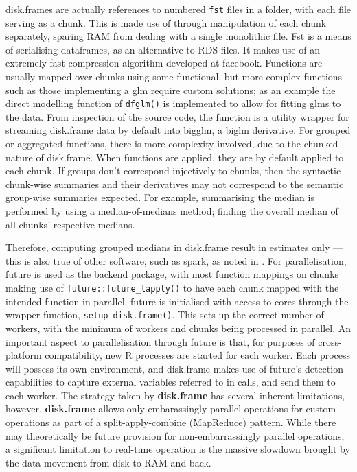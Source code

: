 disk.frames are actually references to numbered \texttt{fst} files in a
folder, with each file serving as a chunk.
This is made use of through manipulation of each chunk separately,
sparing RAM from dealing with a single monolithic
file\cite{zj19:_inges_data}.
Fst is a means of serialising dataframes, as an alternative to RDS
files\cite{klik19}.
It makes use of an extremely fast compression algorithm developed at
facebook.
Functions are usually mapped over chunks using some functional, but more
complex functions such as those implementing a glm require custom
solutions; as an example the direct modelling function of
\texttt{dfglm()} is implemented to allow
for fitting glms to the data.
From inspection of the source code, the function is a utility wrapper
for streaming disk.frame data by default into bigglm, a biglm
derivative.
For grouped or aggregated functions, there is more complexity involved,
due to the chunked nature of disk.frame.
When functions are applied, they are by default applied to each chunk.
If groups don't correspond injectively to chunks, then the syntactic
chunk-wise summaries and their derivatives may not correspond to the
semantic group-wise summaries expected.
For example, summarising the median is performed by using a
median-of-medians method; finding the overall median of all chunks'
respective medians.

Therefore, computing grouped medians in disk.frame result in estimates
only --- this is also true of other software, such as spark, as noted in
\cite{zj19:_group_by}.
For parallelisation, future is used as the backend package, with most
function mappings on chunks making use of
\texttt{future::future_lapply()}
to have each chunk mapped with the intended function in parallel.
future is initialised with access to cores through the wrapper function,
\texttt{setup_disk.frame()}\cite{zj19:_key}.
This sets up the correct number of workers, with the minimum of workers
and chunks being processed in parallel.
An important aspect to parallelisation through future is that, for
purposes of cross-platform compatibility, new R processes are started
for each worker\cite{zj19:_using}.
Each process will possess its own environment, and disk.frame makes use
of future's detection capabilities to capture external variables
referred to in calls, and send them to each worker.
The strategy taken by \textbf{disk.frame} has several inherent
limitations, however. \textbf{disk.frame} allows only embarassingly
parallel operations for custom operations as part of a
split-apply-combine (MapReduce) pattern.
While there may theoretically be future provision for non-embarrassingly
parallel operations, a significant limitation to real-time operation is
the massive slowdown brought by the data movement from disk to RAM and
back.

